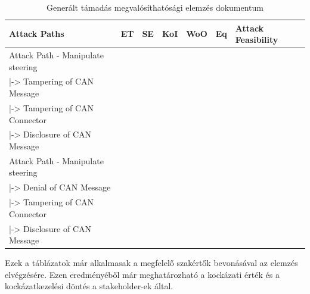 \begin{table}[h]
\centering
\begin{tabular}{|l|l|l|l|l|l|l|}
	\hline
	Attack Paths & ET & SE & KoI & WoO & Eq & Attack Feasibility \\ \hline
	Attack Path - Manipulate steering & ~ & ~ & ~ & ~ & ~ & ~ \\ \hline
	|-> Tampering of CAN Message & ~ & ~ & ~ & ~ & ~ & ~ \\ \hline
	|-> Tampering of CAN Connector & ~ & ~ & ~ & ~ & ~ & ~ \\ \hline
	|-> Disclosure of CAN Message & ~ & ~ & ~ & ~ & ~ & ~ \\ \hline
	Attack Path - Manipulate steering & ~ & ~ & ~ & ~ & ~ & ~ \\ \hline
	|-> Denial of CAN Message & ~ & ~ & ~ & ~ & ~ & ~ \\ \hline
	|-> Tampering of CAN Connector & ~ & ~ & ~ & ~ & ~ & ~ \\ \hline
	|-> Disclosure of CAN Message & ~ & ~ & ~ & ~ & ~ & ~ \\ \hline
\end{tabular}
\caption{Generált támadás megvalósíthatósági elemzés dokumentum}
\label{tab:attack_feas}
\end{table}

Ezek a táblázatok már alkalmasak a megfelelő szakértők bevonásával az elemzés elvégzésére. Ezen eredményéből már meghatározható a kockázati érték és a kockázatkezelési döntés a stakeholder-ek által.